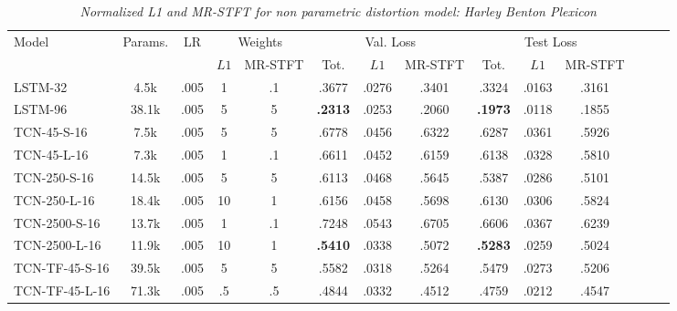 \setlength{\tabcolsep}{4pt}
\begin{table*}[h]
    \centering
    \small
    \caption{\textit{Normalized L1 and MR-STFT for non parametric distortion model: Harley Benton Plexicon}}
    \begin{tabular}{lccccccccccccc}
        \toprule
        \multirow{2}{*}{Model}
            & \multirow{2}{*}{Params.}
                & \multirow{2}{*}{LR}
                    & \multicolumn{2}{c}{Weights}
                        & \multicolumn{3}{c}{Val. Loss}
                            & \multicolumn{3}{c}{Test Loss} \\ 
        \cmidrule(lr){4-5} 
            \cmidrule(lr){6-8} 
                \cmidrule(lr){9-11}
        &   &   & $L1$ & MR-STFT & Tot. & $L1$ & MR-STFT & Tot. & $L1$ & MR-STFT \\ 
        \midrule
        LSTM-32
            & 4.5k  & .005 & 1 & .1 & .3677 & .0276 & .3401 & .3324 &  .0163 & .3161 \\
        LSTM-96       
            & 38.1k & .005 & 5 & 5 & \textbf{.2313} & .0253 & .2060 &  \textbf{.1973} & .0118 & .1855 \\
        \midrule
        TCN-45-S-16               
            & 7.5k & .005 & 5 & 5 & .6778 & .0456 & .6322 &  .6287 & .0361 & .5926 \\ 
        TCN-45-L-16               
            & 7.3k & .005 & 1 & .1 & .6611 & .0452 & .6159 & .6138 & .0328 & .5810 \\
        TCN-250-S-16               
            & 14.5k & .005 & 5 & 5 & .6113 & .0468 & .5645 & .5387 & .0286 & .5101 \\ 
        TCN-250-L-16               
            & 18.4k & .005 & 10 & 1 & .6156 & .0458 & .5698 & .6130 & .0306 & .5824 \\
        TCN-2500-S-16               
            & 13.7k & .005 & 1 & .1 & .7248 & .0543 & .6705 & .6606 & .0367 & .6239 \\ 
        TCN-2500-L-16               
            & 11.9k & .005 & 10 & 1 & \textbf{.5410} & .0338 & .5072 & \textbf{.5283} & .0259 & .5024 \\
        \midrule
        TCN-TF-45-S-16               
            & 39.5k & .005 & 5 & 5 & .5582 & .0318 & .5264 & .5479 & .0273 & .5206 \\
        TCN-TF-45-L-16               
            & 71.3k & .005 & .5 & .5 & .4844 & .0332 & .4512 & .4759 & .0212 & .4547 \\

\end{tabular}
\end{table*}
